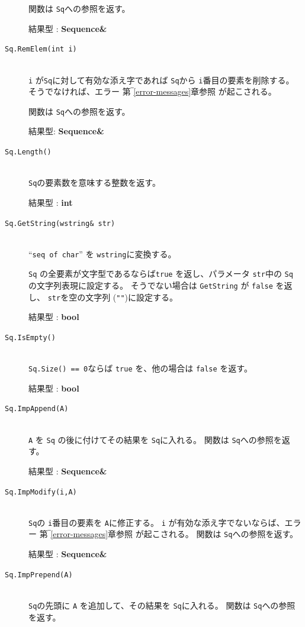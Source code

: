 \documentclass[\pformat,12pt]{jarticle}
\begin{document}
\begin{description}
     関数は {\tt Sq}への参照を返す。

     結果型 : {\bf Sequence\&}

\item[{\tt Sq.RemElem(int i)}] \mbox{}\\
      {\tt i} が{\tt Sq}に対して有効な添え字であれば {\tt Sq}から {\tt i}番目の要素を削除する。
 そうでなければ、エラー 第‾\ref{error-messages}章参照 が起こされる。

  関数は {\tt Sq}への参照を返す。

     結果型: {\bf Sequence\&}

\item[{\tt Sq.Length()}] \mbox{}\\     
     {\tt Sq}の要素数を意味する整数を返す。

     結果型 : {\bf int}

\item[{\tt Sq.GetString(wstring\& str)}] \mbox{}\\     
   ``{\tt seq of char}'' を {\tt wstring}に変換する。

  {\tt Sq} の全要素が文字型であるならば{\tt true} を返し、パラメータ {\tt str}中の {\tt Sq} の文字列表現に設定する。 
 そうでない場合は {\tt GetString} が {\tt false} を返し、 {\tt str}を空の文字列 ({\tt ""})に設定する。
  
  結果型 : {\bf bool}

\item[{\tt Sq.IsEmpty()}] \mbox{}\\     
      {\tt Sq.Size() == 0}ならば {\tt true} を、他の場合は {\tt false} を返す。

     結果型 : {\bf bool}

\item[{\tt Sq.ImpAppend(A)}] \mbox{}\\     
     {\tt A} を {\tt Sq} の後に付けてその結果を {\tt Sq}に入れる。
     関数は {\tt Sq}への参照を返す。

     結果型 : {\bf Sequence\&}

\item[{\tt Sq.ImpModify(i,A)}] \mbox{}\\     
     {\tt Sq}の {\tt i}番目の要素を {\tt A}に修正する。 
 {\tt i} が有効な添え字でないならば、エラー 第‾\ref{error-messages}章参照 が起こされる。
     関数は {\tt Sq}への参照を返す。

     結果型 : {\bf Sequence\&}

\item[{\tt Sq.ImpPrepend(A)}] \mbox{}\\     
      {\tt Sq}の先頭に {\tt A} を追加して、その結果を {\tt Sq}に入れる。
     関数は {\tt Sq}への参照を返す。


\end{description}
\end{document}
